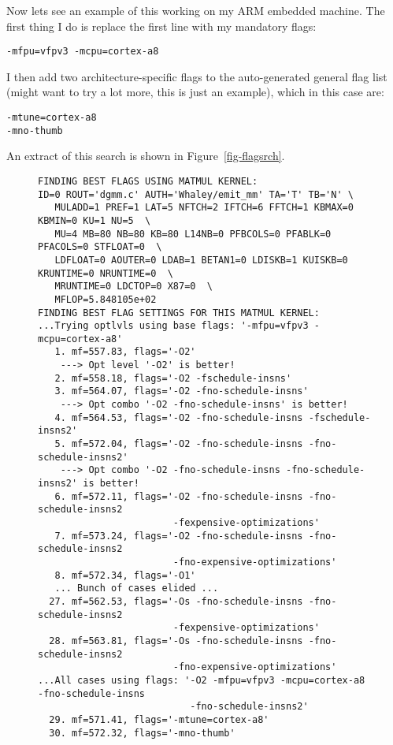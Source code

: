 \documentclass[11pt]{article}
\begin{document}
Now lets see an example of this working on my ARM embedded machine.  The first
thing I do is replace the first line with my mandatory flags:
\begin{verbatim}
-mfpu=vfpv3 -mcpu=cortex-a8
\end{verbatim}
I then add two architecture-specific flags to the auto-generated general
flag list (might want to try a lot more, this is just an example), 
which in this case are:
\begin{verbatim}
-mtune=cortex-a8
-mno-thumb
\end{verbatim}

An extract of this search is shown in Figure~\ref{fig-flagsrch}.

\begin{figure}[p]
\begin{footnotesize}
\begin{verbatim}
FINDING BEST FLAGS USING MATMUL KERNEL:
ID=0 ROUT='dgmm.c' AUTH='Whaley/emit_mm' TA='T' TB='N' \
   MULADD=1 PREF=1 LAT=5 NFTCH=2 IFTCH=6 FFTCH=1 KBMAX=0 KBMIN=0 KU=1 NU=5  \
   MU=4 MB=80 NB=80 KB=80 L14NB=0 PFBCOLS=0 PFABLK=0 PFACOLS=0 STFLOAT=0  \
   LDFLOAT=0 AOUTER=0 LDAB=1 BETAN1=0 LDISKB=1 KUISKB=0 KRUNTIME=0 NRUNTIME=0  \
   MRUNTIME=0 LDCTOP=0 X87=0  \
   MFLOP=5.848105e+02
FINDING BEST FLAG SETTINGS FOR THIS MATMUL KERNEL:
...Trying optlvls using base flags: '-mfpu=vfpv3 -mcpu=cortex-a8'
   1. mf=557.83, flags='-O2'
    ---> Opt level '-O2' is better!
   2. mf=558.18, flags='-O2 -fschedule-insns'
   3. mf=564.07, flags='-O2 -fno-schedule-insns'
    ---> Opt combo '-O2 -fno-schedule-insns' is better!
   4. mf=564.53, flags='-O2 -fno-schedule-insns -fschedule-insns2'
   5. mf=572.04, flags='-O2 -fno-schedule-insns -fno-schedule-insns2'
    ---> Opt combo '-O2 -fno-schedule-insns -fno-schedule-insns2' is better!
   6. mf=572.11, flags='-O2 -fno-schedule-insns -fno-schedule-insns2 
                        -fexpensive-optimizations'
   7. mf=573.24, flags='-O2 -fno-schedule-insns -fno-schedule-insns2 
                        -fno-expensive-optimizations'
   8. mf=572.34, flags='-O1'
   ... Bunch of cases elided ...
  27. mf=562.53, flags='-Os -fno-schedule-insns -fno-schedule-insns2 
                        -fexpensive-optimizations'
  28. mf=563.81, flags='-Os -fno-schedule-insns -fno-schedule-insns2 
                        -fno-expensive-optimizations'
...All cases using flags: '-O2 -mfpu=vfpv3 -mcpu=cortex-a8 -fno-schedule-insns
                           -fno-schedule-insns2'
  29. mf=571.41, flags='-mtune=cortex-a8'
  30. mf=572.32, flags='-mno-thumb'

\end{verbatim}
\end{footnotesize}
\end{figure}
\end{document}
